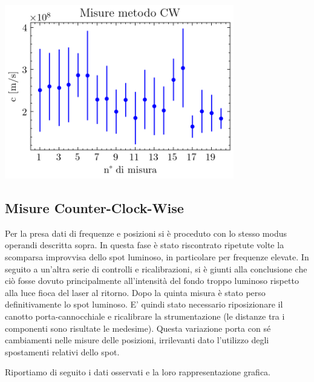 \documentclass[openright]{article}
\begin{document}
\begin{minipage}{\textwidth}
\begin{minipage}[b]{0.35\linewidth}
\begin{tabular}{  c  c  }
                    \bottomrule
                    \end{tabular}
                \end{minipage}
                \begin{minipage}[b]{0.65\linewidth}  
                \centering
                \includegraphics[width=10cm]{../images/CW.png}
                \label{Misure CW}
            \end{minipage}
        \end{minipage}
        
    \subsection{Misure Counter-Clock-Wise}

    Per la presa dati di frequenze e posizioni si è proceduto con lo stesso modus operandi descritta sopra. 
    In questa fase è stato riscontrato ripetute volte la scomparsa improvvisa dello spot luminoso, in particolare per frequenze elevate. In seguito a un'altra serie di controlli e ricalibrazioni, si è giunti alla conclusione che ciò fosse dovuto principalmente all'intensità del fondo troppo luminoso rispetto alla luce fioca del laser al ritorno. 
    Dopo la quinta misura è stato perso definitivamente lo spot luminoso. E' quindi stato necessario riposizionare il canotto porta-cannocchiale e ricalibrare la strumentazione (le distanze tra i componenti sono risultate le medesime).
    Questa variazione porta con sé cambiamenti nelle misure delle posizioni, irrilevanti dato l'utilizzo degli spostamenti relativi dello spot.

    Riportiamo di seguito i dati osservati e la loro rappresentazione grafica.   
\end{document}
